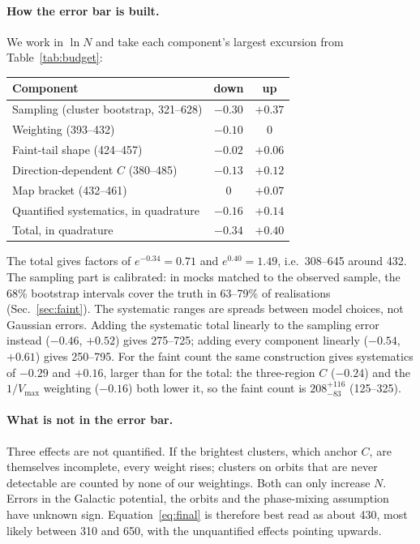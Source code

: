 \documentclass[11pt,a4paper]{article}
\begin{document}
\paragraph{How the error bar is built.} We work in $\ln N$ and take each component's largest excursion
from Table~\ref{tab:budget}:
\begin{center}
\small
\begin{tabular}{lcc}
\toprule
Component & down & up \\
\midrule
Sampling (cluster bootstrap, 321--628) & $-0.30$ & $+0.37$ \\
Weighting (393--432) & $-0.10$ & 0 \\
Faint-tail shape (424--457) & $-0.02$ & $+0.06$ \\
Direction-dependent $C$ (380--485) & $-0.13$ & $+0.12$ \\
Map bracket (432--461) & 0 & $+0.07$ \\
\midrule
Quantified systematics, in quadrature & $-0.16$ & $+0.14$ \\
Total, in quadrature & $-0.34$ & $+0.40$ \\
\bottomrule
\end{tabular}
\end{center}
The total gives factors of $e^{-0.34}=0.71$ and $e^{0.40}=1.49$, i.e.\ 308--645 around 432. The sampling
part is calibrated: in mocks matched to the observed sample, the 68\% bootstrap intervals cover the truth in
63--79\% of realisations (Sec.~\ref{sec:faint}). The systematic ranges are spreads between model choices,
not Gaussian errors. Adding the systematic total linearly to the sampling error instead ($-0.46$, $+0.52$)
gives 275--725; adding every component linearly ($-0.54$, $+0.61$) gives 250--795. For the faint count the same construction gives systematics of $-0.29$ and $+0.16$, larger than
for the total: the three-region $C$ ($-0.24$) and the $1/V_{\max}$ weighting ($-0.16$) both lower it, so
the faint count is $208^{+116}_{-83}$ (125--325).

\paragraph{What is not in the error bar.} Three effects are not quantified. If the brightest clusters,
which anchor $C$, are themselves incomplete, every weight rises; clusters on orbits that are never
detectable are counted by none of our weightings. Both can only increase $N$. Errors in the Galactic
potential, the orbits and the phase-mixing assumption have unknown sign. Equation~\ref{eq:final} is
therefore best read as about 430, most likely between 310 and 650, with the unquantified effects pointing
upwards.
\end{document}
